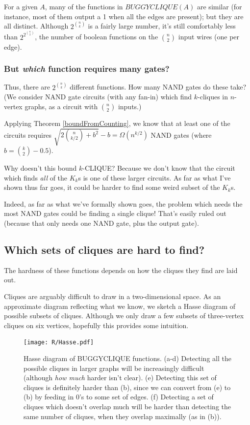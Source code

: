 \documentclass[12pt]{article}
\theoremstyle{definition}
\begin{document}
For a given $A$, many of the functions in $BUGGYCLIQUE(A)$
are similar (for instance, most
of them output a 1 when all the edges are present);
but they are all distinct.
Although $2^{n \choose k}$ is a fairly large number,
it's still comfortably less than $2^{2^{n \choose 2}}$, the number of boolean
functions on the ${n \choose 2}$ input wires (one per edge).

\subsubsection{But {\em which} function requires many gates?}

Thus, there are $2^{n \choose k}$ different functions. 
How many NAND gates do these take?
(We consider NAND gate circuits (with any fan-in) which find $k$-cliques in $n$-vertex
graphs, as a circuit with $n \choose 2$ inputs.)

Applying Theorem
\ref{boundFromCounting}, we know that at least one of the circuits requires
${\sqrt {2 {n \choose {k/2}} + b^2}} - b = \Omega(n^{k/2})$ 
NAND gates (where $b = {k \choose 2} - 0.5$).

Why doesn't this bound $k$-CLIQUE?
Because we don't know that the circuit which finds {\em all} of the
$K_k$s is one of these larger circuits. As far as what I've
shown thus far goes, it could be harder to find some weird subset of the $K_k$s.

Indeed, as far as what we've formally shown goes, the problem which needs
the most NAND gates could be finding a single clique! That's easily ruled out
(because that only needs one NAND gate, plus the output gate).

\subsection{Which sets of cliques are hard to find?}
\label{sec:whichCliques}

The hardness of these functions depends
on how the cliques they find are laid out.

Cliques are arguably difficult to draw in a two-dimensional space.
As an approximate diagram reflecting what we know,
we sketch a Hasse diagram of possible subsets of cliques. Although
we only draw a few subsets of three-vertex cliques
on six vertices, hopefully this provides some
intuition.

\begin{figure}
\centering
\texttt{[image: R/Hasse.pdf]}
\caption{Hasse diagram of BUGGYCLIQUE functions.
(a-d) 
Detecting all the possible cliques in larger graphs will be
increasingly difficult (although {\em how much} harder isn't clear).
(e) 
Detecting this set of cliques is definitely harder than (b),
since we can convert from (e) to (b) by feeding in 0's to
some set of edges.
(f) Detecting a set of cliques which doesn't overlap much will be
harder than detecting the same number of cliques, when they overlap
maximally (as in (b)).}
\label{fig:Hasse}
\end{figure}
\end{document}
